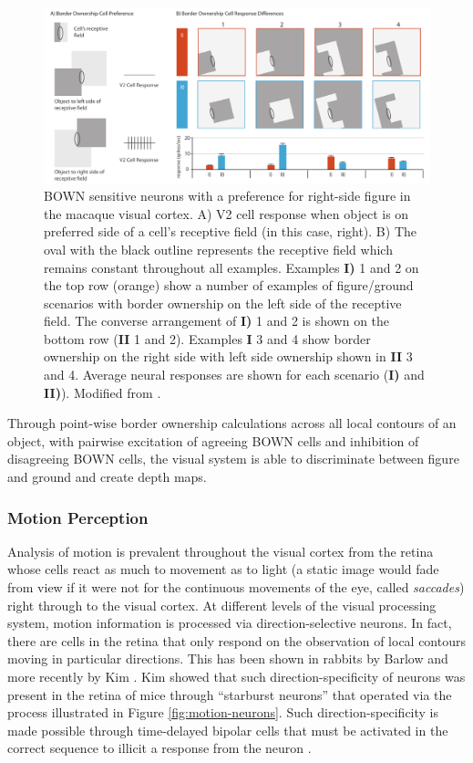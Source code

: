 \begin{figure}[t!]
\centering
\includegraphics[width=\textwidth]{images/related-work/bown-neurons}
\caption{BOWN sensitive neurons with a preference for right-side figure in the macaque visual cortex. A) V2 cell response when object is on preferred side of a cell's receptive field (in this case, right). B) The oval with the black outline represents the receptive field which remains constant throughout all examples. Examples \textbf{I)} 1 and 2 on the top row (orange) show a number of examples of figure/ground scenarios with border ownership on the left side of the receptive field. The converse arrangement of \textbf{I)} 1 and 2 is shown on the bottom row (\textbf{II} 1 and 2). Examples \textbf{I} 3 and 4 show border ownership on the right side with left side ownership shown in \textbf{II} 3 and 4. Average neural responses are shown for each scenario (\textbf{I)} and \textbf{II)}). Modified from \cite{zhou2000coding, kandel2012principles}.}
\label{fig:bown-examples}
\end{figure}

Through point-wise border ownership calculations across all local contours of an object, with pairwise excitation of agreeing BOWN cells and inhibition of disagreeing BOWN cells, the visual system is able to discriminate between figure and ground and create depth maps.

\subsubsection{Motion Perception}
Analysis of motion is prevalent throughout the visual cortex from the retina \cite{kimspace2014, kandel2012principles} whose cells react as much to movement as to light (a static image would fade from view if it were not for the continuous movements of the eye, called \emph{saccades}) right through to the visual cortex. 
At different levels of the visual processing system, motion information is processed via direction-selective neurons. 
In fact, there are cells in the retina that only respond on the observation of local contours moving in particular directions. This has been shown in rabbits by Barlow \etal \cite{Barlow01021963} and more recently by Kim \etal \cite{kimspace2014}.
Kim \etal showed that such direction-specificity of neurons was present in the retina of mice through ``starburst neurons'' that operated via the process illustrated in Figure \ref{fig:motion-neurons}.
Such direction-specificity is made possible through time-delayed bipolar cells that must be activated in the correct sequence to illicit a response from the neuron \cite{kimspace2014}.

